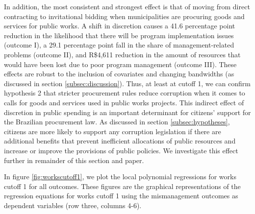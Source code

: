 \documentclass[11pt]{article}
\begin{document}
In addition, the most consistent and strongest effect is that of moving from direct contracting to invitational bidding when municipalities are procuring goods and services for public works. A shift in discretion causes a 41.6 percentage point reduction in the likelihood that there will be program implementation issues (outcome I), a 29.1 percentage point fall in the share of management-related problems (outcome II), and R\$4,611 reduction in the amount of resources that would have been lost due to poor program management (outcome III). These effects are robust to the inclusion of covariates and changing bandwidths (as discussed in section \ref{subsec:discussion}). Thus, at least at cutoff 1, we can confirm hypothesis 2 that stricter procurement rules reduce corruption when it comes to calls for goods and services used in public works projects. This indirect effect of discretion in public spending is an important determinant for citizens' support for the Brazilian procurement law. As discussed in section \ref{subsec:hypotheses}, citizens are more likely to support any corruption legislation if there are additional benefits that prevent inefficient allocations of public resources and increase or improve the provisions of public policies. We investigate this effect further in remainder of this section and paper.

 In figure \ref{fig:workscutoff1}, we plot the local polynomial regressions for works cutoff 1 for all outcomes. These figures are the graphical representations of the regression equations for works cutoff 1 using the mismanagement outcomes as dependent variables (row three, columns 4-6).
\end{document}
